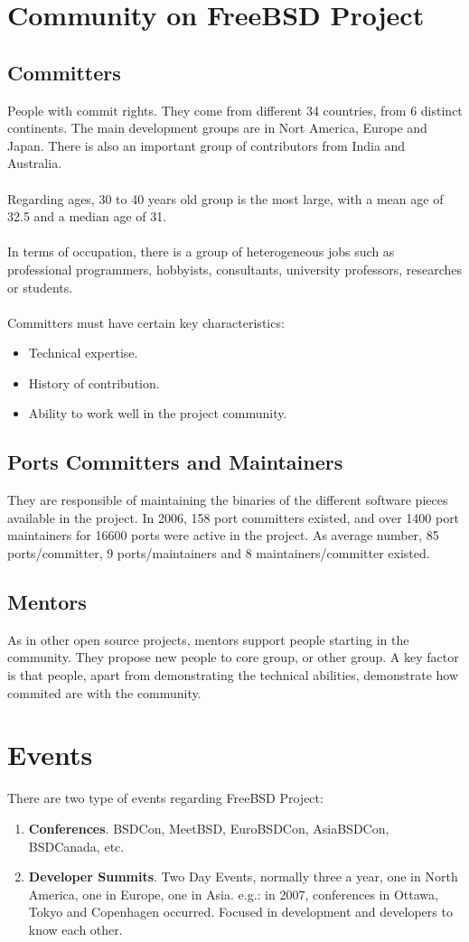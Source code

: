 \documentclass[11pt]{article}
\begin{document}
\section{Community on FreeBSD Project}
\subsection{Committers} 
People with commit rights. They come from different 34 countries, from 6 distinct continents. The main development groups are in Nort America, Europe and Japan. There is also an important group of contributors from India and Australia.\\
\\
Regarding ages, 30 to 40 years old group is the most large, with a mean age of 32.5 and a median age of 31.\\
\\
In terms of occupation, there is a group of heterogeneous jobs such as professional programmers, hobbyists, consultants, university professors, researches or students.\\
\\
Committers must have certain key characteristics:
\begin{itemize}\itemsep0pt
\item{Technical expertise}.
\item{History of contribution}.
\item{Ability to work well in the project community}.
\end{itemize}
\subsection{Ports Committers and Maintainers} 
They are responsible of maintaining the binaries of the different software pieces available in the project.
In 2006, 158 port committers existed, and over 1400 port maintainers for 16600 ports were active in the project. As average number, 85 ports/committer, 9 ports/maintainers and 8 maintainers/committer existed.
\subsection{Mentors} 
As in other open source projects, mentors support people starting in the community.
They propose new people to core group, or other group. A key factor is that people, apart from demonstrating the technical abilities, demonstrate how commited are with the community.
\section{Events}
There are two type of events regarding FreeBSD Project:
\begin{enumerate}\itemsep0pt
\item{\textbf{Conferences}}. BSDCon, MeetBSD, EuroBSDCon, AsiaBSDCon, BSDCanada, etc.
\item{\textbf{Developer Summits}}. Two Day Events, normally three a year, one in North America, one in Europe, one in Asia. e.g.: in 2007, conferences in Ottawa, Tokyo and Copenhagen occurred. Focused in development and developers to know each other.
\end{enumerate}
\end{document}
